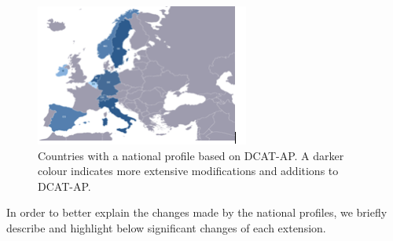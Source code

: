 \documentclass[<options>]{elsarticle}
\begin{document}
\begin{figure}[H]
\includegraphics{replace2.png}
\caption{Countries with a national profile based on DCAT-AP. A darker colour indicates more extensive modifications and additions to DCAT-AP.}
\end{figure}

In order to better explain the changes made by the national profiles, we briefly describe and highlight below significant changes of each extension.
\end{document}

